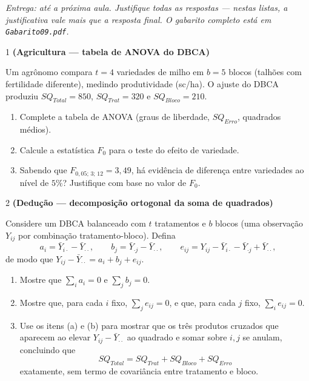\documentclass[11pt]{article}
\begin{document}

\noindent \textit{Entrega: até a próxima aula. Justifique todas as respostas — nestas listas, a
justificativa vale mais que a resposta final. O gabarito completo está em \texttt{Gabarito09.pdf}.}

\begin{questao}{1} \textbf{(Agricultura --- tabela de ANOVA do DBCA)}

Um agrônomo compara $t=4$ variedades de milho em $b=5$ blocos (talhões com fertilidade
diferente), medindo produtividade (sc/ha). O ajuste do DBCA produziu $SQ_{Total}=850$,
$SQ_{Trat}=320$ e $SQ_{Bloco}=210$.

\begin{enumerate}[label=(\alph*)]
  \item Complete a tabela de ANOVA (graus de liberdade, $SQ_{Erro}$, quadrados médios).
  \item Calcule a estatística $F_0$ para o teste do efeito de variedade.
  \item Sabendo que $F_{0{,}05;\,3;\,12}=3{,}49$, há evidência de diferença entre variedades ao
    nível de $5\%$? Justifique com base no valor de $F_0$.
\end{enumerate}
\end{questao}

\begin{questao}{2} \textbf{(Dedução --- decomposição ortogonal da soma de quadrados)}

Considere um DBCA balanceado com $t$ tratamentos e $b$ blocos (uma observação $Y_{ij}$ por
combinação tratamento-bloco). Defina
$$
a_i = \bar Y_{i\cdot} - \bar Y_{\cdot\cdot}, \qquad
b_j = \bar Y_{\cdot j} - \bar Y_{\cdot\cdot}, \qquad
e_{ij} = Y_{ij} - \bar Y_{i\cdot} - \bar Y_{\cdot j} + \bar Y_{\cdot\cdot},
$$
de modo que $Y_{ij}-\bar Y_{\cdot\cdot} = a_i + b_j + e_{ij}$.

\begin{enumerate}[label=(\alph*)]
  \item Mostre que $\sum_i a_i = 0$ e $\sum_j b_j = 0$.
  \item Mostre que, para cada $i$ fixo, $\sum_j e_{ij}=0$, e que, para cada $j$ fixo,
    $\sum_i e_{ij}=0$.
  \item Use os itens (a) e (b) para mostrar que os três produtos cruzados que aparecem ao
    elevar $Y_{ij}-\bar Y_{\cdot\cdot}$ ao quadrado e somar sobre $i,j$ se anulam, concluindo que
    $$
    SQ_{Total} = SQ_{Trat} + SQ_{Bloco} + SQ_{Erro}
    $$
    exatamente, sem termo de covariância entre tratamento e bloco.
\end{enumerate}
\end{questao}
\end{document}
